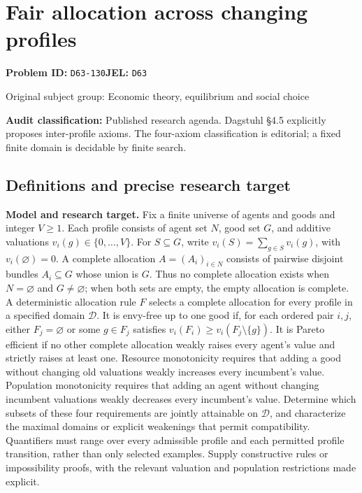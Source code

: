 \documentclass[11pt,a4paper]{article}
\begin{document}
\section*{Fair allocation across changing profiles}
\textbf{Problem ID:} \texttt{D63-130}\quad \textbf{JEL:} \texttt{D63}\par
\label{problem:OP-0278}
{\sffamily\small\color{muted}Original subject group: Economic theory, equilibrium and social choice\par}
\label{definitions:problem:30007560}
\textbf{Audit classification:} Published research agenda. Dagstuhl §4.5 explicitly proposes inter-profile axioms. The four-axiom classification is editorial; a fixed finite domain is decidable by finite search.
\subsection*{Definitions and precise research target}
\textbf{Model and research target.} Fix a finite universe of agents and goods and integer \(V\geq1\). Each profile consists of agent set \(N\), good set \(G\), and additive valuations \(v_i(g)\in\{0,\ldots,V\}\). For \(S\subseteq G\), write \(v_i(S)=\sum_{g\in S}v_i(g)\), with \(v_i(\varnothing)=0\). A complete allocation \(A=(A_i)_{i\in N}\) consists of pairwise disjoint bundles \(A_i\subseteq G\) whose union is \(G\). Thus no complete allocation exists when \(N=\varnothing\) and \(G\ne\varnothing\); when both sets are empty, the empty allocation is complete. A deterministic allocation rule \(F\) selects a complete allocation for every profile in a specified domain \(\mathcal D\). It is envy-free up to one good if, for each ordered pair \(i,j\), either \(F_j=\varnothing\) or some \(g\in F_j\) satisfies \(v_i(F_i)\geq v_i(F_j\setminus\{g\})\). It is Pareto efficient if no other complete allocation weakly raises every agent's value and strictly raises at least one. Resource monotonicity requires that adding a good without changing old valuations weakly increases every incumbent's value. Population monotonicity requires that adding an agent without changing incumbent valuations weakly decreases every incumbent's value. Determine which subsets of these four requirements are jointly attainable on \(\mathcal D\), and characterize the maximal domains or explicit weakenings that permit compatibility. Quantifiers must range over every admissible profile and each permitted profile transition, rather than only selected examples. Supply constructive rules or impossibility proofs, with the relevant valuation and population restrictions made explicit.
\end{document}
